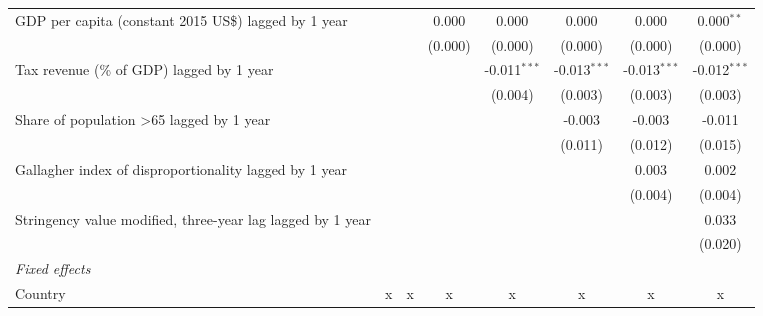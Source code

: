 \begin{tabular}{lccccccc}
   GDP per capita (constant 2015 US\$) lagged by 1 year                                              &             &             & 0.000        & 0.000          & 0.000          & 0.000          & 0.000$^{**}$\\   
                                                                                                     &             &             & (0.000)      & (0.000)        & (0.000)        & (0.000)        & (0.000)\\   
   Tax revenue (\% of GDP) lagged by 1 year                                                          &             &             &              & -0.011$^{***}$ & -0.013$^{***}$ & -0.013$^{***}$ & -0.012$^{***}$\\   
                                                                                                     &             &             &              & (0.004)        & (0.003)        & (0.003)        & (0.003)\\   
   Share of population >65 lagged by 1 year                                                          &             &             &              &                & -0.003         & -0.003         & -0.011\\   
                                                                                                     &             &             &              &                & (0.011)        & (0.012)        & (0.015)\\   
   Gallagher index of disproportionality lagged by 1 year                                            &             &             &              &                &                & 0.003          & 0.002\\   
                                                                                                     &             &             &              &                &                & (0.004)        & (0.004)\\   
   Stringency value modified, three-year lag lagged by 1 year                                        &             &             &              &                &                &                & 0.033\\   
                                                                                                     &             &             &              &                &                &                & (0.020)\\   
   \emph{Fixed effects}\\
   Country                                                                                           & x           & x           & x            & x              & x              & x              & x\\  

\end{tabular}
